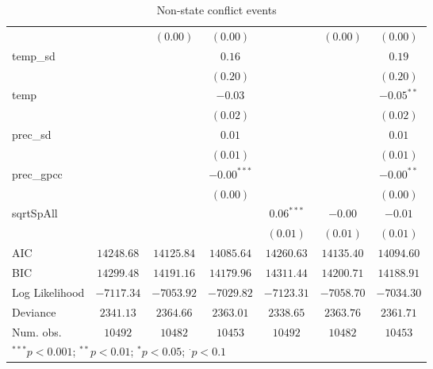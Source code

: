 \begin{sidewaystable}
\begin{center}
{\begin{tabular}{l c c c c c c}
                &               & $(0.00)$      & $(0.00)$      &               & $(0.00)$        & $(0.00)$       \\
temp\_sd        &               &               & $0.16$        &               &                 & $0.19$         \\
                &               &               & $(0.20)$      &               &                 & $(0.20)$       \\
temp            &               &               & $-0.03$       &               &                 & $-0.05^{**}$   \\
                &               &               & $(0.02)$      &               &                 & $(0.02)$       \\
prec\_sd        &               &               & $0.01$        &               &                 & $0.01$         \\
                &               &               & $(0.01)$      &               &                 & $(0.01)$       \\
prec\_gpcc      &               &               & $-0.00^{***}$ &               &                 & $-0.00^{**}$   \\
                &               &               & $(0.00)$      &               &                 & $(0.00)$       \\
sqrtSpAll       &               &               &               & $0.06^{***}$  & $-0.00$         & $-0.01$        \\
                &               &               &               & $(0.01)$      & $(0.01)$        & $(0.01)$       \\
\hline
AIC             & $14248.68$    & $14125.84$    & $14085.64$    & $14260.63$    & $14135.40$      & $14094.60$     \\
BIC             & $14299.48$    & $14191.16$    & $14179.96$    & $14311.44$    & $14200.71$      & $14188.91$     \\
Log Likelihood  & $-7117.34$    & $-7053.92$    & $-7029.82$    & $-7123.31$    & $-7058.70$      & $-7034.30$     \\
Deviance        & $2341.13$     & $2364.66$     & $2363.01$     & $2338.65$     & $2363.76$       & $2361.71$      \\
Num. obs.       & $10492$       & $10482$       & $10453$       & $10492$       & $10482$         & $10453$        \\
\hline
\multicolumn{7}{l}{\scriptsize{$^{***}p<0.001$; $^{**}p<0.01$; $^{*}p<0.05$; $^{\cdot}p<0.1$}}
\end{tabular}
}
\caption{Non-state conflict events}
\label{non_state}
\end{center}
\end{sidewaystable}

